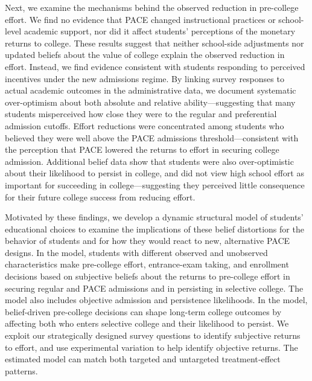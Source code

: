 Next, we examine the mechanisms behind the observed reduction in pre-college effort. We find no evidence that PACE changed instructional practices or school-level academic support, nor did it affect students’ perceptions of the monetary returns to college. These results suggest that neither school-side adjustments nor updated beliefs about the value of college explain the observed reduction in effort. Instead, we find evidence consistent with students responding to perceived incentives under the new admissions regime. By linking survey responses to actual academic outcomes in the administrative data, we document systematic over-optimism about both absolute and relative ability—suggesting that many students misperceived how close they were to the regular and preferential admission cutoffs. Effort reductions were concentrated among students who believed they were well above the PACE admissions threshold—consistent with the perception that PACE lowered the returns to effort in securing college admission. Additional belief data show that students were also over-optimistic about their likelihood to persist in college, and did not view high school effort as important for succeeding in college—suggesting they perceived little consequence for their future college success from reducing effort. \par 

Motivated by these findings, we develop a dynamic structural model of students’ educational choices to examine the implications of these belief distortions for the behavior of students and for how they would react to new, alternative PACE designs. In the model, students with different observed and unobserved characteristics make pre-college effort, entrance-exam taking, and enrollment decisions based on subjective beliefs about the returns to pre-college effort in securing regular and PACE admissions and in persisting in selective college. The model also includes objective admission and persistence likelihoods. In the model, belief-driven pre-college decisions can shape long-term college outcomes by affecting both who enters selective college and their likelihood to persist. We exploit our strategically designed survey questions to identify subjective returns to effort, and use experimental variation to help identify objective returns. The estimated model can match both targeted and untargeted treatment‐effect patterns.\par










